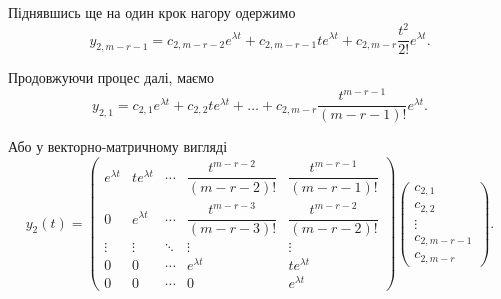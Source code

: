 \begin{enumerate}
Піднявшись ще на один крок нагору одержимо
\begin{equation*}
	y_{2, m - r - 1} = c_{2, m - r - 2} e^{\lambda t} + c_{2, m - r - 1} t e^{\lambda t} + c_{2, m - r } \frac{t^2}{2!} e^{\lambda t}.
\end{equation*}

Продовжуючи процес далі, маємо
\begin{equation*}
	y_{2, 1} = c_{2, 1} e^{\lambda t} + c_{2, 2} t e^{\lambda t} + \ldots + c_{2, m - r} \frac{t^{m - r - 1}}{(m - r - 1)!} e^{\lambda t}.
\end{equation*}

Або у векторно-матричному вигляді
\begin{equation*}
	y_2(t) = 
	\begin{pmatrix}
		e^{\lambda t} & t e^{\lambda t} & \cdots & \dfrac{t^{m - r - 2}}{(m - r - 2)!} & \dfrac{t^{m - r - 1}}{(m - r - 1)!} \\
		0 & e^{\lambda t} & \cdots & \dfrac{t^{m - r - 3}}{(m - r - 3)!} & \dfrac{t^{m - r - 2}}{(m - r - 2)!} \\
		\vdots & \vdots & \ddots & \vdots & \vdots \\
		0 & 0 & \cdots & e^{\lambda t} & t e^{\lambda t} \\
		0 & 0 & \cdots & 0 & e^{\lambda t}
	\end{pmatrix}
	\begin{pmatrix} c_{2,1} \\ c_{2,2} \\ \vdots \\ c_{2,m-r-1} \\ c_{2,m-r} \end{pmatrix}.
\end{equation*}


\end{enumerate}
